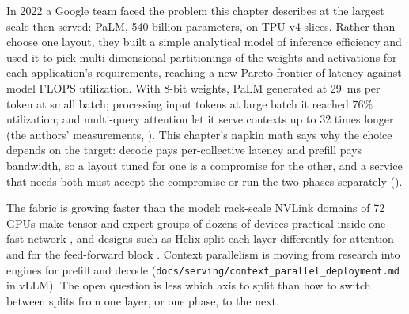 


In 2022 a Google team faced the problem this chapter describes at the largest
scale then served: PaLM, 540 billion parameters, on TPU v4 slices. Rather than
choose one layout, they built a simple analytical model of inference
efficiency and used it to pick multi-dimensional partitionings of the weights
and activations for each application's requirements, reaching a new Pareto
frontier of latency against model FLOPS utilization. With 8-bit weights, PaLM
generated at 29~ms per token at small batch; processing input tokens at large
batch it reached 76\% utilization; and multi-query attention let it serve
contexts up to 32 times longer (the authors' measurements,
\cite{pope2022scaling}). This chapter's napkin math says why the choice depends
on the target: decode pays per-collective latency and prefill pays bandwidth,
so a layout tuned for one is a compromise for the other, and a service that
needs both must accept the compromise or run the two phases separately
().


The fabric is growing faster than the model: rack-scale NVLink domains of 72
GPUs make tensor and expert groups of dozens of devices practical inside one
fast network \cite{nvidia2026gb300}, and designs such as Helix split each layer
differently for attention and for the feed-forward block
\cite{bhatia2025helix}. Context parallelism is moving from research into
engines for prefill and decode (\texttt{docs/serving/context\_parallel\_deployment.md}
in vLLM). The open question is less which axis to split than how to switch
between splits from one layer, or one phase, to the next.

\ExercisesSection

